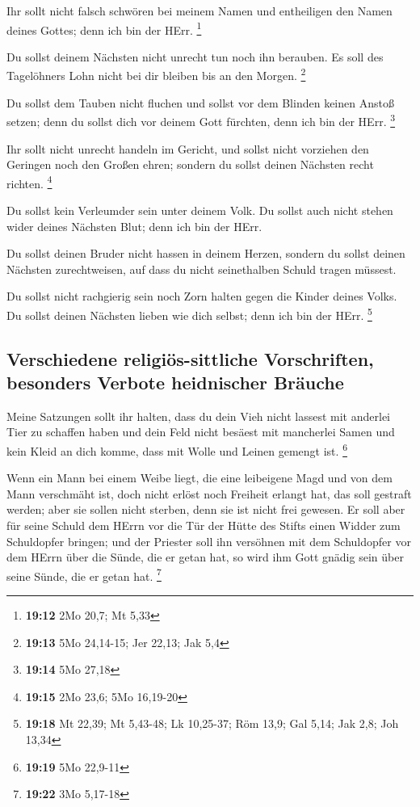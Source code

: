  Ihr sollt nicht falsch schwören bei meinem Namen und
entheiligen den Namen deines Gottes; denn ich bin der HErr. \footnote{\textbf{19:12}
  2Mo 20,7; Mt 5,33}

 Du sollst deinem Nächsten nicht unrecht tun noch ihn
berauben. Es soll des Tagelöhners Lohn nicht bei dir bleiben bis an den
Morgen. \footnote{\textbf{19:13} 5Mo 24,14-15; Jer 22,13; Jak 5,4}

 Du sollst dem Tauben nicht fluchen und sollst vor dem
Blinden keinen Anstoß setzen; denn du sollst dich vor deinem Gott
fürchten, denn ich bin der HErr. \footnote{\textbf{19:14} 5Mo 27,18}

 Ihr sollt nicht unrecht handeln im Gericht, und sollst
nicht vorziehen den Geringen noch den Großen ehren; sondern du sollst
deinen Nächsten recht richten. \footnote{\textbf{19:15} 2Mo 23,6; 5Mo
  16,19-20}

 Du sollst kein Verleumder sein unter deinem Volk. Du
sollst auch nicht stehen wider deines Nächsten Blut; denn ich bin der
HErr.

 Du sollst deinen Bruder nicht hassen in deinem Herzen,
sondern du sollst deinen Nächsten zurechtweisen, auf dass du nicht
seinethalben Schuld tragen müssest.

 Du sollst nicht rachgierig sein noch Zorn halten gegen
die Kinder deines Volks. Du sollst deinen Nächsten lieben wie dich
selbst; denn ich bin der HErr. \footnote{\textbf{19:18} Mt 22,39; Mt
  5,43-48; Lk 10,25-37; Röm 13,9; Gal 5,14; Jak 2,8; Joh 13,34}

\hypertarget{verschiedene-religiuxf6s-sittliche-vorschriften-besonders-verbote-heidnischer-bruxe4uche}{%
\subsection{Verschiedene religiös-sittliche Vorschriften, besonders
Verbote heidnischer
Bräuche}\label{verschiedene-religiuxf6s-sittliche-vorschriften-besonders-verbote-heidnischer-bruxe4uche}}

 Meine Satzungen sollt ihr halten, dass du dein Vieh
nicht lassest mit anderlei Tier zu schaffen haben und dein Feld nicht
besäest mit mancherlei Samen und kein Kleid an dich komme, dass mit
Wolle und Leinen gemengt ist. \footnote{\textbf{19:19} 5Mo 22,9-11}

 Wenn ein Mann bei einem Weibe liegt, die eine leibeigene
Magd und von dem Mann verschmäht ist, doch nicht erlöst noch Freiheit
erlangt hat, das soll gestraft werden; aber sie sollen nicht sterben,
denn sie ist nicht frei gewesen.  Er soll aber für seine
Schuld dem HErrn vor die Tür der Hütte des Stifts einen Widder zum
Schuldopfer bringen;  und der Priester soll ihn versöhnen
mit dem Schuldopfer vor dem HErrn über die Sünde, die er getan hat, so
wird ihm Gott gnädig sein über seine Sünde, die er getan hat.
\footnote{\textbf{19:22} 3Mo 5,17-18}

